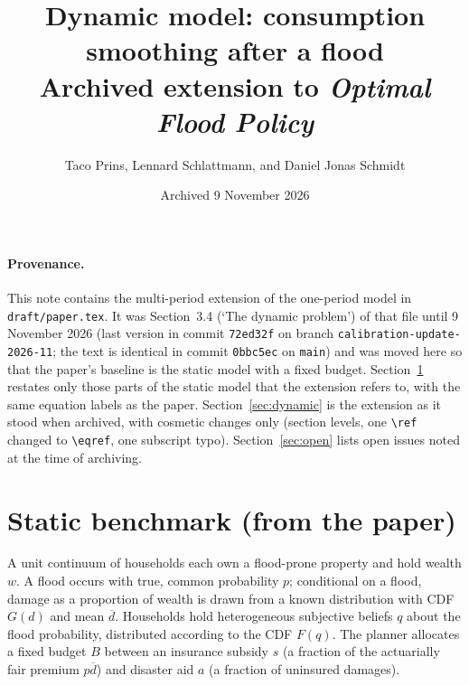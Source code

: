\documentclass[12pt]{article}
\title{Dynamic model: consumption smoothing after a flood\\[0.5em]\large Archived extension to \emph{Optimal Flood Policy}}
\author{Taco Prins, Lennard Schlattmann, and Daniel Jonas Schmidt}
\date{Archived 9 November 2026}
\begin{document}
\maketitle

\paragraph{Provenance.} This note contains the multi-period extension of the one-period model in \texttt{draft/paper.tex}. It was Section~3.4 (`The dynamic problem') of that file until 9 November 2026 (last version in commit \texttt{72ed32f} on branch \texttt{calibration-update-2026-11}; the text is identical in commit \texttt{0bbc5ec} on \texttt{main}) and was moved here so that the paper's baseline is the static model with a fixed budget. Section~\ref{sec:static} restates only those parts of the static model that the extension refers to, with the same equation labels as the paper. Section~\ref{sec:dynamic} is the extension as it stood when archived, with cosmetic changes only (section levels, one \verb|\ref| changed to \verb|\eqref|, one subscript typo). Section~\ref{sec:open} lists open issues noted at the time of archiving.

\section{Static benchmark (from the paper)}
\label{sec:static}

A unit continuum of households each own a flood-prone property and hold wealth $w$. A flood occurs with true, common probability $p$; conditional on a flood, damage as a proportion of wealth is drawn from a known distribution with CDF $G(d)$ and mean $\overline{d}$. Households hold heterogeneous subjective beliefs $q$ about the flood probability, distributed according to the CDF $F(q)$. The planner allocates a fixed budget $B$ between an insurance subsidy $s$ (a fraction of the actuarially fair premium $p\overline{d}$) and disaster aid $a$ (a fraction of uninsured damages).
\end{document}

